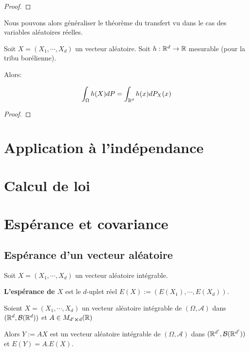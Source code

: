 \ifdefined\outputproof
\begin{proof}

\end{proof}

Nous pouvons alors généraliser le théorème du transfert vu dans le cas des
variables aléatoires réelles.

\begin{theorem} 
	Soit $X = (X_{1}, \cdots, X_{d})$ un vecteur aléatoire.
	Soit $h : \mathbb{R}^{d} \rightarrow \mathbb{R}$ mesurable (pour la tribu borélienne).

	Alors:

	\begin{equation}
		\int_{\Omega} h(X) dP = \int_{\mathbb{R}^{d}} h(x) dP_{X}(x)
	\end{equation}
	\label{theorem:transfert_vecteur_aleatoire}
\end{theorem}

\ifdefined\outputproof
\begin{proof}

\end{proof}


\section{Application à l'indépendance}


\section{Calcul de loi}

\section{Espérance et covariance}

\subsection{Espérance d'un vecteur aléatoire}

\begin{definition}
	Soit $X = (X_{1}, \cdots, X_{d})$ un vecteur aléatoire intégrable.

	\textbf{L'espérance de $X$} est le $d$-uplet réel $E(X) := (E(X_{1}),
	\cdots, E(X_{d}))$.
\end{definition}

\begin{proposition}
	Soient $X = (X_{1}, \cdots, X_{d})$ un vecteur aléatoire intégrable de $(\Omega,
	\mathcal{A})$ dans $(\mathbb{R}^{d}, \mathcal{B}(\mathbb{R}^{d}))$ et $A \in
	M_{d' \cross d}(\mathbb{R})$

	Alors $Y := A X$ est un vecteur aléatoire intégrable de $(\Omega,
	\mathcal{A})$ dans $(\mathbb{R}^{d'}, \mathcal{B}(\mathbb{R}^{d'}))$ et $E(Y) = A .
	E(X)$.
\end{proposition}

